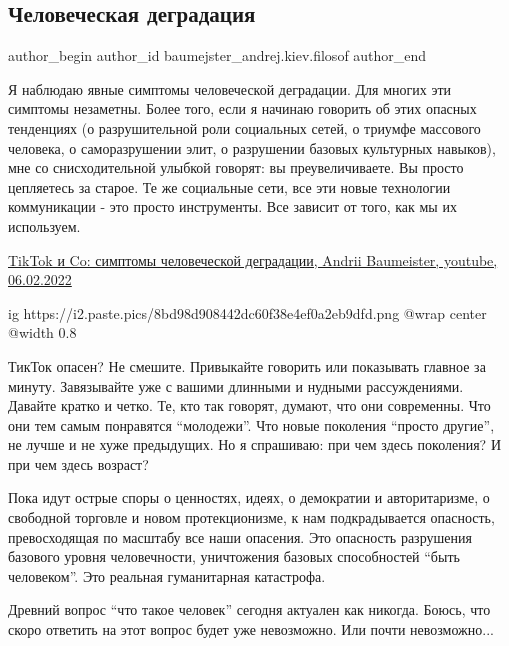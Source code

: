  
 
 
 
 
 
\subsection{Человеческая деградация}
\label{sec:06_02_2022.fb.baumejster_andrej.kiev.filosof.1.chelovek_degradacia}
 
\ifcmt
 author_begin
   author_id baumejster_andrej.kiev.filosof
 author_end
\fi

Я наблюдаю явные симптомы человеческой деградации. Для многих эти симптомы
незаметны. Более того, если я начинаю говорить об этих опасных тенденциях (о
разрушительной роли социальных сетей, о триумфе массового человека, о
саморазрушении элит, о разрушении базовых культурных навыков), мне со
снисходительной улыбкой говорят: вы преувеличиваете. Вы просто цепляетесь за
старое. Те же социальные сети, все эти новые технологии коммуникации - это
просто инструменты. Все зависит от того, как мы их используем. 

\href{https://www.youtube.com/watch?v=VP7xBTn3nNs}{%
TikTok и Co: симптомы человеческой деградации, Andrii Baumeister, youtube, 06.02.2022%
}

\ifcmt
  ig https://i2.paste.pics/8bd98d908442dc60f38e4ef0a2eb9dfd.png
  @wrap center
  @width 0.8
\fi

ТикТок опасен? Не смешите. Привыкайте говорить или показывать главное за
минуту. Завязывайте уже с вашими длинными и нудными рассуждениями. Давайте
кратко и четко.  Те, кто так говорят, думают, что они современны. Что они тем
самым понравятся \enquote{молодежи}. Что новые поколения \enquote{просто
другие}, не лучше и не хуже предыдущих. Но я спрашиваю: при чем здесь
поколения? И при чем здесь возраст? 

Пока идут острые споры о ценностях, идеях, о демократии и авторитаризме, о
свободной торговле и новом протекционизме, к нам подкрадывается опасность,
превосходящая по масштабу все наши опасения. Это опасность разрушения базового
уровня человечности, уничтожения базовых способностей \enquote{быть человеком}.
Это реальная гуманитарная катастрофа. 

Древний вопрос \enquote{что такое человек} сегодня актуален как никогда. Боюсь,
что скоро ответить на этот  вопрос будет уже невозможно. Или почти
невозможно...


